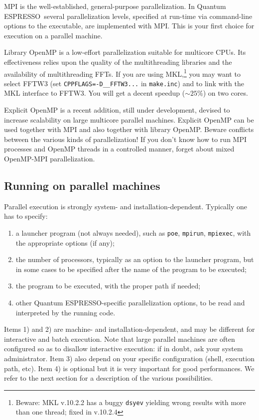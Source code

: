 \documentclass[12pt,a4paper]{article}
\def\qe{{\sc Quantum ESPRESSO}}
\begin{document}
MPI is the well-established, general-purpose parallelization.
In \qe\ several parallelization levels, specified at run-time
via command-line options to the executable, are implemented
with MPI. This is your first choice for execution on a parallel
machine.

Library OpenMP is a low-effort parallelization suitable for
multicore CPUs. Its effectiveness relies upon the quality of
the multithreading libraries and the availability of
multithreading FFTs. If you are using MKL,\footnote{Beware:
MKL v.10.2.2 has a buggy \texttt{dsyev} yielding wrong results
with more than one thread; fixed in v.10.2.4}
you may want to select FFTW3 (set \texttt{CPPFLAGS=-D\_\_FFTW3...}
in \texttt{make.inc}) and to link with the MKL interface to FFTW3.
You will get a decent speedup ($\sim 25$\%) on two cores.

Explicit OpenMP is a recent addition, still under
development, devised to increase scalability on
large multicore parallel machines. Explicit OpenMP can be used
together with MPI and also together with library OpenMP. Beware
conflicts between the various kinds of parallelization!
If you don't know how to run MPI processes
and OpenMP threads in a controlled manner, forget about mixed
OpenMP-MPI parallelization.

\subsection{Running on parallel machines}

Parallel execution is strongly system- and installation-dependent.
Typically one has to specify:
\begin{enumerate}
\item a launcher program (not always needed),
such as \texttt{poe}, \texttt{mpirun}, \texttt{mpiexec},
  with the  appropriate options (if any);
\item the number of processors, typically as an option to the launcher
  program, but in some cases to be specified after the name of the
  program to be
  executed;
\item the program to be executed, with the proper path if needed;
\item other \qe-specific parallelization options, to be
  read and interpreted by the running code.
\end{enumerate}
Items 1) and 2) are machine- and installation-dependent, and may be
different for interactive and batch execution. Note that large
parallel machines are  often configured so as to disallow interactive
execution: if in doubt, ask your system administrator.
Item 3) also depend on your specific configuration (shell, execution path, etc).
Item 4) is optional but it is very important
for good performances. We refer to the next
section for a description of the various
possibilities.
\end{document}
